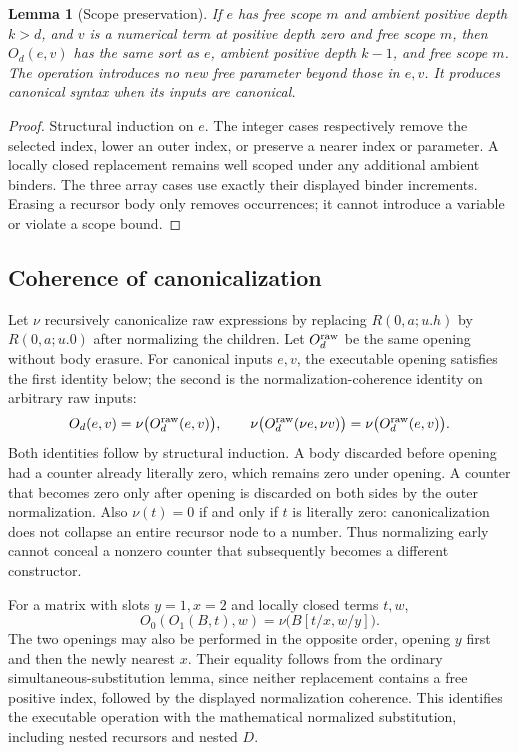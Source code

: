 \documentclass[11pt,letterpaper]{article}
\newtheorem{lemma}[theorem]{Lemma}
\theoremstyle{definition}\newtheorem{definition}[theorem]{Definition}
\begin{document}
\begin{lemma}[Scope preservation]
If $e$ has free scope $m$ and ambient positive depth $k>d$, and $v$ is a numerical term
at positive depth zero and free scope $m$, then $O_d(e,v)$ has the same
sort as $e$, ambient positive depth $k-1$, and free scope $m$.
The operation introduces no new free parameter beyond those in $e,v$.
It produces canonical syntax when its inputs are canonical.
\end{lemma}
\begin{proof}
Structural induction on $e$. The integer cases respectively remove the
selected index, lower an outer index, or preserve a nearer index or
parameter. A locally closed replacement remains well scoped under any
additional ambient binders. The three array cases use exactly their
displayed binder increments. Erasing a recursor body only removes
occurrences; it cannot introduce a variable or violate a scope bound.
\end{proof}

\subsection{Coherence of canonicalization}

Let $\nu$ recursively canonicalize raw expressions by replacing
$R(0,a;u.h)$ by $R(0,a;u.0)$ after normalizing the children. Let
$O_d^{\rm raw}$ be the same opening without body erasure. For canonical
inputs $e,v$, the executable opening satisfies the first identity below;
the second is the normalization-coherence identity on arbitrary raw inputs:
\[
 O_d(e,v)=\nu\bigl(O_d^{\rm raw}(e,v)\bigr),
 \qquad
 \nu\bigl(O_d^{\rm raw}(\nu e,\nu v)\bigr)
 =\nu\bigl(O_d^{\rm raw}(e,v)\bigr).
\]
Both identities follow by structural induction. A body discarded before
opening had a counter already literally zero, which remains zero under
opening. A counter that becomes zero only after opening is discarded on
both sides by the outer normalization. Also $\nu(t)=0$ if and only if
$t$ is literally zero: canonicalization does not collapse an entire
recursor node to a number. Thus normalizing early cannot conceal a
nonzero counter that subsequently becomes a different constructor.

For a matrix with slots $y=1,x=2$ and locally closed terms $t,w$,
\[
 O_0(O_1(B,t),w)
 =\nu\bigl(B[t/x,w/y]\bigr).
\]
The two openings may also be performed in the opposite order, opening
$y$ first and then the newly nearest $x$. Their equality follows from
the ordinary simultaneous-substitution lemma, since neither replacement
contains a free positive index, followed by the displayed normalization
coherence. This identifies the executable operation with the mathematical
normalized substitution, including nested recursors and nested $D$.
\end{document}
